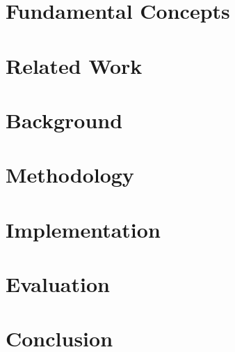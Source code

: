 \documentclass[12pt,a4paper,oneside]{book}
\begin{document}
\chapter{Fundamental Concepts}\label{chapter:fundamental}


\chapter{Related Work}\label{chapter:related_work}


\chapter{Background}\label{chapter:background}


\chapter{Methodology}\label{chapter:methodology}


\chapter{Implementation}\label{chapter:implementation}


\chapter{Evaluation}\label{chapter:evaluation}


\chapter{Conclusion}\label{chapter:conclusion}






\end{document}
